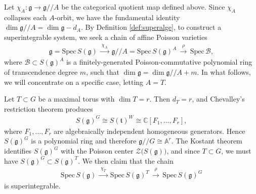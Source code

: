 \documentclass[11pt,reqno]{amsart}
\newtheorem*{theorem A}{Main Theorem A}
\newtheorem*{theorem B}{Main Theorem B}
\newtheorem*{theorem C}{Main Theorem C}
\newtheorem*{theorem D}{Main Theorem D}
\theoremstyle{definition}
\theoremstyle{plain}
\theoremstyle{conclusion}
\begin{document}
Let $\chi_A:\mathfrak{g} \rightarrow \mathfrak{g}//A $ be the categorical quotient map defined above. Since $\chi_A$ collapses each $A$-orbit, we have the fundamental identity $ \dim \mathfrak{g}//A  =\dim\mathfrak{g} - d_A $. By Definition \ref{def:superalge}, to construct a superintegrable system, we seek a chain of affine Poisson varieties \begin{align}
     \mathfrak{g} =\mathrm{Spec}\, S(\mathfrak{g}) \,\xrightarrow{\,\chi_A\,}\, \mathfrak{g}//A =\mathrm{Spec} \, S(\mathfrak{g})^A \,\xrightarrow{\,\rho\,}\, \mathrm{Spec} \, \mathcal{B},
\end{align} where $\mathcal{B}\subset S(\mathfrak{g})^A$ is a finitely-generated Poisson-commutative polynomial ring of transcendence degree $m$, such that $
\dim\mathfrak{g} =\dim \mathfrak{g}//A+m$. In what follows, we will concentrate on a specific case, letting $A = T$.

Let $T\subset G$ be a maximal torus with $\dim T=r$. Then $d_T=r$, and Chevalley’s restriction theorem produces \begin{align}
  S(\mathfrak{g})^G \cong S(\mathfrak{t})^W \cong \mathbb{C}[F_1,\ldots,F_r], \label{eq:crt}
\end{align} where $F_1,\ldots,F_r$ are algebraically independent homogeneous generators. Hence $S(\mathfrak{g})^G$ is a polynomial ring and therefore $\mathfrak{g}//G \cong \mathbb{A}^r$.  The Kostant theorem identifies $S(\mathfrak{g})^G$ with the Poisson center $\mathcal{Z}\bigl(S(\mathfrak{g})\bigr)$, and since $T \subset G$, we must have $S(\mathfrak{g})^G \subset S(\mathfrak{g})^T$.  %
We then claim that the chain \begin{align}
    \mathrm{Spec}\, S(\mathfrak{g}) \,\xrightarrow{\ \chi_T\ }\,
 \mathrm{Spec}\, S(\mathfrak{g})^T \,\xrightarrow{\ \rho\ }\,
\mathrm{Spec}\, S(\mathfrak{g})^G
\end{align} is superintegrable. %
\end{document}
